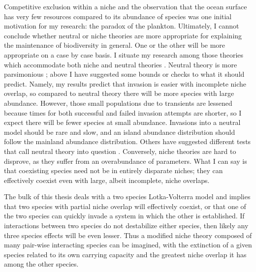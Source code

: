 Competitive exclusion within a niche and the observation that the ocean surface has very few resources compared to its abundance of species was one initial motivation for my research: the paradox of the plankton. 
Ultimately, I cannot conclude whether neutral or niche theories are more appropriate for explaining the maintenance of biodiversity in general. 
One or the other will be more appropriate on a case by case basis. 
I situate my research among those theories which accommodate both niche and neutral theories \cite{Leibold2006,Ofiteru2010,Pigolotti2013,Fisher2014,Kessler2015}. 
Neutral theory is more parsimonious \cite{Leibold2006}; above I have suggested some bounds or checks to what it should predict. 
Namely, my results predict that invasion is easier with incomplete niche overlap, so compared to neutral theory there will be more species with large abundance. 
However, those small populations due to transients are lessened because times for both successful and failed invasion attempts are shorter, so I expect there will be fewer species at small abundance. 
Invasions into a neutral model should be rare and slow, and an island abundance distribution should follow the mainland abundance distribution. %
Others have suggested different tests that call neutral theory into question \cite{McGill2003,Ricklefs2006,Kelly2008,Adler2010,Rosindell2011,Carroll2015}. 
Conversely, niche theories are hard to disprove, as they suffer from an overabundance of parameters. 
What I can say is that coexisting species need not be in entirely disparate niches; they can effectively coexist even with large, albeit incomplete, niche overlaps. 

The bulk of this thesis deals with a two species Lotka-Volterra model and implies that two species with partial niche overlap will effectively coexist, or that one of the two species can quickly invade a system in which the other is established. 
If interactions between two species do not destabilize either species, then likely any three species effects will be even lesser. 
Thus a modified niche theory composed of many pair-wise interacting species can be imagined, with the extinction of a given species related to its own carrying capacity and the greatest niche overlap it has among the other species. 

